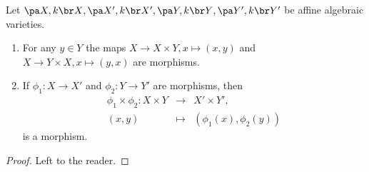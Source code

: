 \documentclass[12pt,a4paper]{scrartcl}
\theoremstyle{cplain}
\theoremstyle{cplain}
\theoremstyle{cplain}
\theoremstyle{definition}
\begin{document}
\begin{otherlanguage}{english}
\begin{lem}
  Let $\aav X, \aav {X'}, \aav Y, \aav {Y'}$ be affine algebraic varieties.
  \begin{enumerate}
  \item For any $y\in Y$ the maps $X \to X \times Y, x \mapsto (x,y)$ and $X \to Y\times X, x \mapsto (y,x)$ are morphisms.
  \item If $\phi_1\colon X \to X'$ and $\phi_2\colon Y\to Y'$ are morphisms, then \begin{eqnarray*}\phi_1\times \phi_2\colon X \times Y &\to& X' \times Y', \\(x,y) &\mapsto& (\phi_1(x),\phi_2(y))\end{eqnarray*} is a morphism.
  \end{enumerate}
\end{lem}
\begin{proof}
  Left to the reader.
\end{proof}


\end{otherlanguage}
\end{document}
